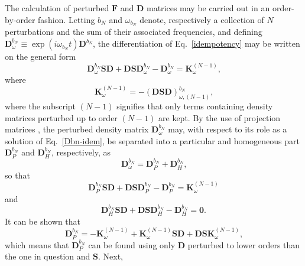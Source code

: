 \documentclass[%
 reprint,
 amsmath,amssymb,
 aps,
]{revtex4-1}
\begin{document}
The calculation of perturbed $\mathbf{F}$ and $\mathbf{D}$ matrices may be
carried out in an order-by-order fashion. Letting $b_{N}$ and $\omega_{b_{N}}$
denote, respectively a collection of $N$ perturbations and the sum of their
associated frequencies, and defining $\mathbf{D}^{b_N}_{\omega} \equiv
\exp{\left( i \omega_{b_{N}} t \right)}\mathbf{D}^{b_N}$, the differentiation
of Eq.~\eqref{idempotency} may be written on the general form
\begin{equation}\label{Dbn-idem}
\mathbf{D}^{b_N}_{\omega} \mathbf{S} \mathbf{D} + \mathbf{D} \mathbf{S} \mathbf{D}^{b_N}_{\omega} - \mathbf{D}^{b_N}_{\omega} =
\mathbf{K}^{(N-1)}_{\omega} \text{,}
\end{equation}
where
\begin{equation}\label{Knminus1}
\mathbf{K}^{(N-1)}_{\omega} = - (\mathbf{DSD})^{b_N}_{\omega,(N-1)}\text{,}
\end{equation}
where the subscript $(N - 1)$ signifies that only terms containing density
matrices  perturbed up to order $(N - 1)$ are kept. By the use of
projection matrices , the perturbed density matrix
$\mathbf{D}^{b_N}_{\omega}$ may, with respect to its role as a solution of
Eq.~\eqref{Dbn-idem}, be separated into a particular and homogeneous part
$\mathbf{D}_{P}^{b_N}$ and $\mathbf{D}_{H}^{b_N}$, respectively, as
\begin{equation}\label{D-partitioning}
\mathbf{D}^{b_N}_{\omega} =
\mathbf{D}_{P}^{b_N} + \mathbf{D}_{H}^{b_N}\text{,}
\end{equation}
so that
\begin{equation}\label{Particular-equation}
\mathbf{D}^{b_N}_P \mathbf{S} \mathbf{D} + \mathbf{D} \mathbf{S} \mathbf{D}^{b_N}_P - \mathbf{D}^{b_N}_{P} =
\mathbf{K}^{(N-1)}_{\omega}
\end{equation}
and
\begin{equation}\label{Homogeneous-equation}
\mathbf{D}^{b_N}_H \mathbf{S} \mathbf{D} + \mathbf{D} \mathbf{S} \mathbf{D}^{b_N}_H - \mathbf{D}^{b_N}_{H} =
\mathbf{0} \text{.}
\end{equation}
It can be shown that
\begin{equation}\label{Particular-final}
\mathbf{D}^{b_N}_P = - \mathbf{K}^{(N-1)}_{\omega} + \mathbf{K}^{(N-1)}_{\omega} \mathbf{S} \mathbf{D} + \mathbf{D} \mathbf{S} \mathbf{K}^{(N-1)}_{\omega} \text{,}
\end{equation}
which means that $\mathbf{D}^{b_N}_P$ can be found using only $\mathbf{D}$
perturbed to lower orders than the one in question and $\mathbf{S}$. Next,
\end{document}

